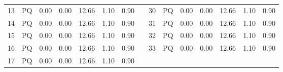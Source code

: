 \documentclass[preprint,12pt]{elsarticle}
\begin{document}
\begin{table}[htbp!]
{\begin{tabular}{ccccccc c ccccccc}
            13 & PQ & 0.00 & 0.00 & 12.66 & 1.10 & 0.90 &  & 30 & PQ & 0.00 & 0.00 & 12.66 & 1.10 & 0.90 \\
            14 & PQ & 0.00 & 0.00 & 12.66 & 1.10 & 0.90 &  & 31 & PQ & 0.00 & 0.00 & 12.66 & 1.10 & 0.90 \\
            15 & PQ & 0.00 & 0.00 & 12.66 & 1.10 & 0.90 &  & 32 & PQ & 0.00 & 0.00 & 12.66 & 1.10 & 0.90 \\
            16 & PQ & 0.00 & 0.00 & 12.66 & 1.10 & 0.90 &  & 33 & PQ & 0.00 & 0.00 & 12.66 & 1.10 & 0.90 \\
            17 & PQ & 0.00 & 0.00 & 12.66 & 1.10 & 0.90 \\
            \cmidrule{1-7} \cmidrule{9-15}
        \end{tabular}
    }
    \label{tab:cs1_ieee33_buses}
\end{table}
\end{document}
